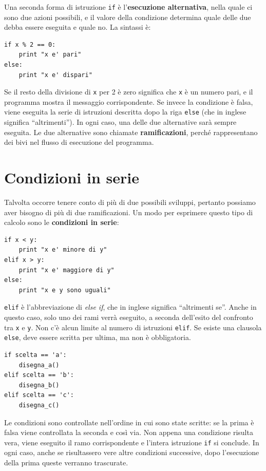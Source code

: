 \documentclass[10pt]{book}
\begin{document}
Una seconda forma di istruzione {\tt if} è l'{\bf esecuzione alternativa},
nella quale ci sono due azioni possibili, e il valore della condizione
determina quale delle due debba essere eseguita e quale no. La sintassi è:

\begin{verbatim}
if x % 2 == 0:
    print "x e' pari"
else:
    print "x e' dispari"
\end{verbatim}
%
Se il resto della divisione di {\tt x} per 2 è zero significa che {\tt x} è un numero pari, e il programma mostra il messaggio corrispondente. Se invece la condizione è falsa, viene eseguita la serie di istruzioni descritta dopo la riga {\tt else} (che in inglese significa ``altrimenti''). In ogni caso, una delle due alternative sarà sempre eseguita. Le due alternative sono chiamate {\bf ramificazioni}, perché rappresentano dei bivi nel flusso di esecuzione del programma.



\section{Condizioni in serie}

Talvolta occorre tenere conto di più di due possibili sviluppi, pertanto possiamo aver bisogno di più di due ramificazioni. Un modo per esprimere questo tipo di calcolo sono le {\bf condizioni in serie}:

\begin{verbatim}
if x < y:
    print "x e' minore di y"
elif x > y:
    print "x e' maggiore di y"
else:
    print "x e y sono uguali"
\end{verbatim}
%
{\tt elif} è l'abbreviazione di {\em else if}, che in inglese significa   ``altrimenti se''. Anche in questo caso, solo uno dei rami verrà eseguito, a seconda dell'esito del confronto tra {\tt x} e {\tt y}. Non c'è alcun limite al numero di istruzioni {\tt elif}. Se esiste una clausola {\tt else}, deve essere scritta per ultima, ma non è obbligatoria.


\begin{verbatim}
if scelta == 'a':
    disegna_a()
elif scelta == 'b':
    disegna_b()
elif scelta == 'c':
    disegna_c()
\end{verbatim}
%
Le condizioni sono controllate nell'ordine in cui sono state scritte: se la prima è falsa viene controllata la seconda e così via. Non appena una condizione risulta vera, viene eseguito il ramo corrispondente e l'intera istruzione {\tt if} si conclude. In ogni caso, anche se risultassero vere altre condizioni successive, dopo l'esecuzione della prima queste verranno trascurate.  
\end{document}
